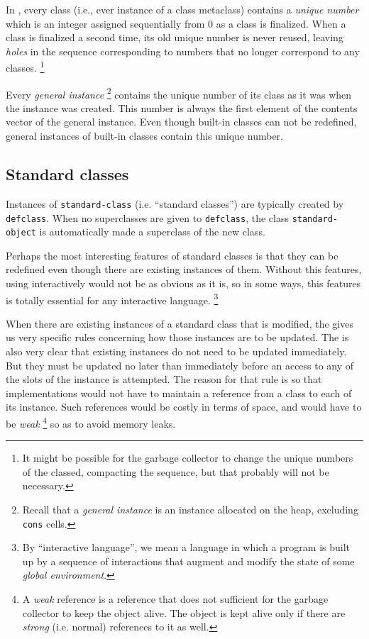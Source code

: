 In \sysname{}, every class (i.e., ever instance of a class metaclass)
contains a \emph{unique number} which is an integer assigned
sequentially from $0$ as a class is finalized.  When a class is
finalized a second time, its old unique number is never reused,
leaving \emph{holes} in the sequence corresponding to numbers that no
longer correspond to any classes.%
\footnote{It might be possible for the garbage collector to change the
  unique numbers of the classed, compacting the sequence, but that
  probably will not be necessary.}

Every \emph{general instance}%
\footnote{Recall that a \emph{general instance} is an instance allocated
  on the heap, excluding \texttt{cons} cells.}
contains the unique number of its class as it was when the instance
was created.  This number is always the first element of the contents
vector of the general instance.  Even though built-in classes can not be
redefined, general instances of built-in classes contain this unique
number. 

\subsection{Standard classes}
\label{object-system-standard-classes}

Instances of \texttt{standard-class} (i.e. ``standard classes'') are
typically created by \texttt{defclass}.  When no superclasses are
given to \texttt{defclass}, the class \texttt{standard-object} is
automatically made a superclass of the new class.  

Perhaps the most interesting features of standard classes is that they
can be redefined even though there are existing instances of them.
Without this features, using \cl{} interactively would not be as
obvious as it is, so in some ways, this features is totally essential
for any interactive language.%
\footnote{By ``interactive language'', we mean a language in which a
  program is built up by a sequence of interactions that augment and
  modify the state of some \emph{global environment}.}

When there are existing instances of a standard class that is
modified, the \hs{} gives us very specific rules concerning how
those instances are to be updated.  The \hs{} is also very clear
that existing instances do not need to be updated immediately.  But
they must be updated no later than immediately before an access to any
of the slots of the instance is attempted.   The reason for that rule
is so that implementations would not have to maintain a reference from
a class to each of its instance.  Such references would be costly in
terms of space, and would have to be \emph{weak}%
\footnote{A \emph{weak} reference is a reference that does not
  sufficient for the garbage collector to keep the object alive.  The
  object is kept alive only if there are \emph{strong} (i.e. normal)
  references to it as well.}
so as to avoid memory leaks. 

